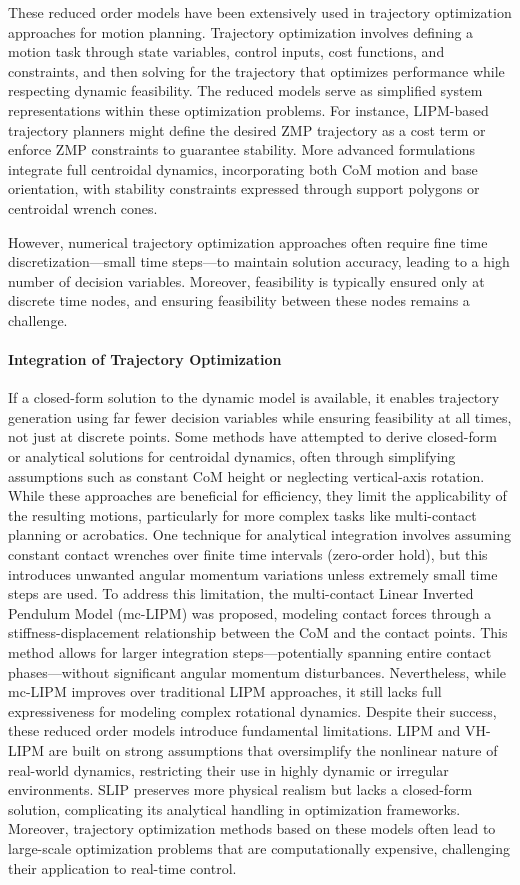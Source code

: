 \documentclass[main.tex]{subfiles}
\begin{document}
These reduced order models have been extensively used in trajectory optimization approaches for motion planning. Trajectory optimization involves defining a motion task through state variables, control inputs, cost functions, and constraints, and then solving for the trajectory that optimizes performance while respecting dynamic feasibility. The reduced models serve as simplified system representations within these optimization problems. For instance, LIPM-based trajectory planners might define the desired ZMP trajectory as a cost term or enforce ZMP constraints to guarantee stability. More advanced formulations integrate full centroidal dynamics, incorporating both CoM motion and base orientation, with stability constraints expressed through support polygons or centroidal wrench cones.

However, numerical trajectory optimization approaches often require fine time discretization—small time steps—to maintain solution accuracy, leading to a high number of decision variables. Moreover, feasibility is typically ensured only at discrete time nodes, and ensuring feasibility between these nodes remains a challenge.

\paragraph{Integration of Trajectory Optimization} If a closed-form solution to the dynamic model is available, it enables trajectory generation using far fewer decision variables while ensuring feasibility at all times, not just at discrete points. Some methods have attempted to derive closed-form or analytical solutions for centroidal dynamics, often through simplifying assumptions such as constant CoM height or neglecting vertical-axis rotation. While these approaches are beneficial for efficiency, they limit the applicability of the resulting motions, particularly for more complex tasks like multi-contact planning or acrobatics. One technique for analytical integration involves assuming constant contact wrenches over finite time intervals (zero-order hold), but this introduces unwanted angular momentum variations unless extremely small time steps are used. To address this limitation, the multi-contact Linear Inverted Pendulum Model (mc-LIPM) was proposed, modeling contact forces through a stiffness-displacement relationship between the CoM and the contact points. This method allows for larger integration steps—potentially spanning entire contact phases—without significant angular momentum disturbances. Nevertheless, while mc-LIPM improves over traditional LIPM approaches, it still lacks full expressiveness for modeling complex rotational dynamics. Despite their success, these reduced order models introduce fundamental limitations. LIPM and VH-LIPM are built on strong assumptions that oversimplify the nonlinear nature of real-world dynamics, restricting their use in highly dynamic or irregular environments. SLIP preserves more physical realism but lacks a closed-form solution, complicating its analytical handling in optimization frameworks. Moreover, trajectory optimization methods based on these models often lead to large-scale optimization problems that are computationally expensive, challenging their application to real-time control.
\end{document}
